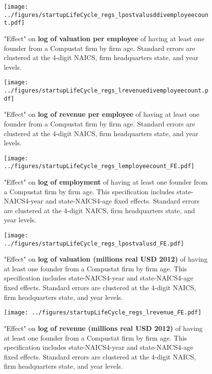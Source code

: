\documentclass[12pt,english]{article}
\theoremstyle{remark}
\begin{document}
\begin{figure}
	\texttt{[image: ../figures/startupLifeCycle\_regs\_lpostvalusddivemployeecount.pdf]}
	\caption{"Effect" on \textbf{log of valuation per employee} of having at least one founder from a Compustat firm by firm age. Standard errors are clustered at the 4-digit NAICS, firm headquarters state, and year levels.}
\end{figure}

\begin{figure}
	\texttt{[image: ../figures/startupLifeCycle\_regs\_lrevenuedivemployeecount.pdf]}
	\caption{"Effect" on \textbf{log of revenue per employee} of having at least one founder from a Compustat firm by firm age. Standard errors are clustered at the 4-digit NAICS, firm headquarters state, and year levels.}
\end{figure}


%

\begin{figure}
	\texttt{[image: ../figures/startupLifeCycle\_regs\_lemployeecount\_FE.pdf]}
	\caption{"Effect" on \textbf{log of employment} of having at least one founder from a Compustat firm by firm age. This specification includes state-NAICS4-year and state-NAICS4-age fixed effects. Standard errors are clustered at the 4-digit NAICS, firm headquarters state, and year levels.}
\end{figure}

\begin{figure}
	\texttt{[image: ../figures/startupLifeCycle\_regs\_lpostvalusd\_FE.pdf]}
	\caption{"Effect" on \textbf{log of valuation (millions real USD 2012)} of having at least one founder from a Compustat firm by firm age. This specification includes state-NAICS4-year and state-NAICS4-age fixed effects. Standard errors are clustered at the 4-digit NAICS, firm headquarters state, and year levels.}
\end{figure}

\begin{figure}
	\texttt{[image: ../figures/startupLifeCycle\_regs\_lrevenue\_FE.pdf]}
	\caption{"Effect" on \textbf{log of revenue (millions real USD 2012)} of having at least one founder from a Compustat firm by firm age. This specification includes state-NAICS4-year and state-NAICS4-age fixed effects. Standard errors are clustered at the 4-digit NAICS, firm headquarters state, and year levels.}
\end{figure}
\end{document}
